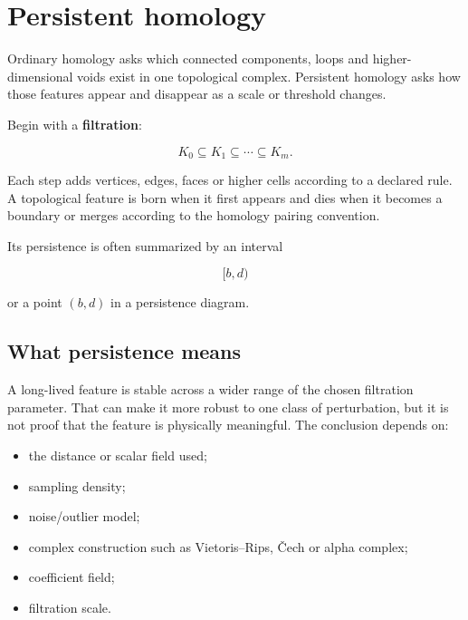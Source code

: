\hypertarget{appendix-e4d8ed8d6787}{}\label{referencestart:appendix-e4d8ed8d6787}
\section{Persistent homology}\label{appendix-e4d8ed8d6787-persistent-homology}

\hypertarget{appendix-e4d8ed8d6787-persistent-homology}{}

Ordinary homology asks which connected components, loops and higher-dimensional voids exist in one topological complex. Persistent homology asks how those features appear and disappear as a scale or threshold changes.

Begin with a \textbf{filtration}:

\[
K_0\subseteq K_1\subseteq\cdots\subseteq K_m.
\]

Each step adds vertices, edges, faces or higher cells according to a declared rule. A topological feature is born when it first appears and dies when it becomes a boundary or merges according to the homology pairing convention.

Its persistence is often summarized by an interval

\[
[b,d)
\]

or a point \((b,d)\) in a persistence diagram.

\subsection{What persistence means}\label{appendix-e4d8ed8d6787-what-persistence-means}

\hypertarget{appendix-e4d8ed8d6787-what-persistence-means}{}

A long-lived feature is stable across a wider range of the chosen filtration parameter. That can make it more robust to one class of perturbation, but it is not proof that the feature is physically meaningful. The conclusion depends on:

\begin{itemize}
\tightlist
\item
  the distance or scalar field used;
\item
  sampling density;
\item
  noise/outlier model;
\item
  complex construction such as Vietoris--Rips, Čech or alpha complex;
\item
  coefficient field;
\item
  filtration scale.
\end{itemize}

